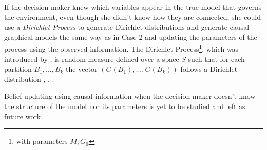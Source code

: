 \documentclass[english,letterpaper,12pt,final]{article}
\theoremstyle{definition}
\begin{document}
If the decision maker knew which variables appear in the true model that governs the environment, even though she didn't know how they are connected, she could use a \textit{Dirichlet Process} to generate Dirichlet distributions and generate causal graphical models the same way as in Case 2 and updating the parameters of the process using the observed information. The Dirichlet Process\footnote{with parameters $M,G_0$}, which was introduced by \cite{ferguson1973bayesian}, is random measure defined over a space $S$ such that for each partition $B_1,...,B_k$ the vector $(G(B_1),...,G(B_k))$ follows a Dirichlet distribution \cite{hjort2010bayesian}, \cite{muller2016bayesian}, \cite{ghosal2017fundamentals}. 

Belief updating using causal information when the decision maker doesn't know the structure of the model nor its parameters is yet to be studied and left as future work. 


\singlespacing



\end{document}
